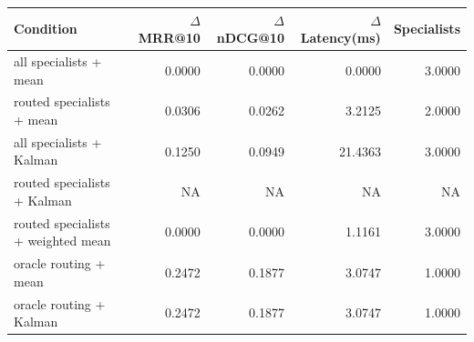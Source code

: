 \begin{tabular}{lrrrr}
\toprule
Condition & $\Delta$MRR@10 & $\Delta$nDCG@10 & $\Delta$Latency(ms) & Specialists \\
\midrule
all specialists + mean & 0.0000 & 0.0000 & 0.0000 & 3.0000 \\
routed specialists + mean & 0.0306 & 0.0262 & 3.2125 & 2.0000 \\
all specialists + Kalman & 0.1250 & 0.0949 & 21.4363 & 3.0000 \\
routed specialists + Kalman & NA & NA & NA & NA \\
routed specialists + weighted mean & 0.0000 & 0.0000 & 1.1161 & 3.0000 \\
oracle routing + mean & 0.2472 & 0.1877 & 3.0747 & 1.0000 \\
oracle routing + Kalman & 0.2472 & 0.1877 & 3.0747 & 1.0000 \\
\bottomrule
\end{tabular}
